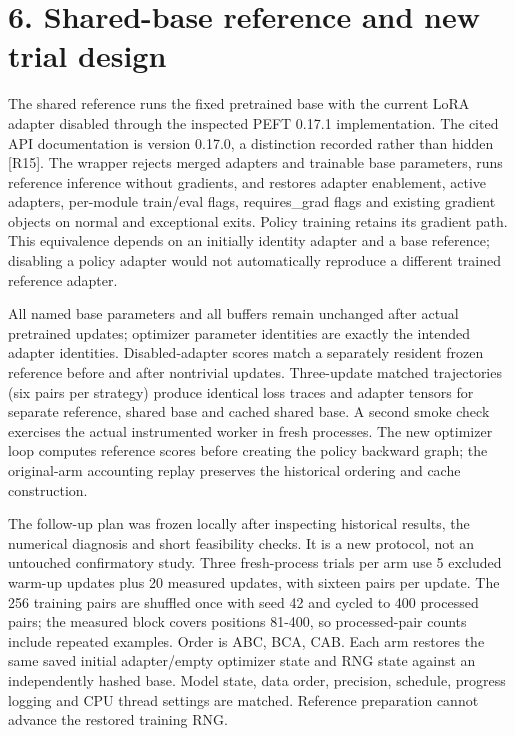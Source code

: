 \documentclass[10pt]{article}
\begin{document}
\section*{6. Shared-base reference and new trial design}

The shared reference runs the fixed pretrained base with the current LoRA adapter disabled through the inspected PEFT 0.17.1 implementation. The cited API documentation is version 0.17.0, a distinction recorded rather than hidden [R15]. The wrapper rejects merged adapters and trainable base parameters, runs reference inference without gradients, and restores adapter enablement, active adapters, per-module train/eval flags, requires\_grad flags and existing gradient objects on normal and exceptional exits. Policy training retains its gradient path. This equivalence depends on an initially identity adapter and a base reference; disabling a policy adapter would not automatically reproduce a different trained reference adapter.


All named base parameters and all buffers remain unchanged after actual pretrained updates; optimizer parameter identities are exactly the intended adapter identities. Disabled-adapter scores match a separately resident frozen reference before and after nontrivial updates. Three-update matched trajectories (six pairs per strategy) produce identical loss traces and adapter tensors for separate reference, shared base and cached shared base. A second smoke check exercises the actual instrumented worker in fresh processes. The new optimizer loop computes reference scores before creating the policy backward graph; the original-arm accounting replay preserves the historical ordering and cache construction.


The follow-up plan was frozen locally after inspecting historical results, the numerical diagnosis and short feasibility checks. It is a new protocol, not an untouched confirmatory study. Three fresh-process trials per arm use 5 excluded warm-up updates plus 20 measured updates, with sixteen pairs per update. The 256 training pairs are shuffled once with seed 42 and cycled to 400 processed pairs; the measured block covers positions 81-400, so processed-pair counts include repeated examples. Order is ABC, BCA, CAB. Each arm restores the same saved initial adapter/empty optimizer state and RNG state against an independently hashed base. Model state, data order, precision, schedule, progress logging and CPU thread settings are matched. Reference preparation cannot advance the restored training RNG.
\end{document}

